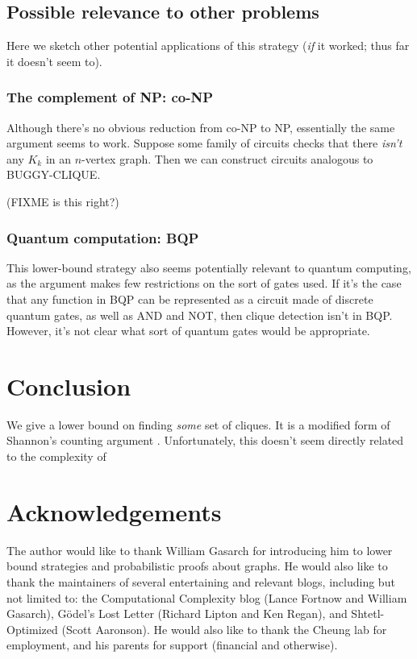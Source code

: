 \documentclass[12pt]{article}
\theoremstyle{definition}
\begin{document}
\subsection{Possible relevance to other problems}

Here we sketch other potential applications of this strategy
({\em if} it worked; thus far it doesn't seem to).

\subsubsection{The complement of NP: co-NP}

Although there's no obvious reduction from co-NP to NP, essentially
the same argument seems to work. Suppose some family of circuits
checks that there {\em isn't} any $K_k$ in an $n$-vertex graph.
Then we can construct circuits analogous to BUGGY-CLIQUE.

(FIXME is this right?)

\subsubsection{Quantum computation: BQP}

This lower-bound strategy also seems potentially
relevant to quantum computing,
as the argument makes few restrictions on the sort of gates used.
If it's the case that any function in BQP can be represented
as a circuit made of discrete quantum gates, as well as AND and NOT,
then clique detection isn't in BQP.
However, it's not clear what sort of quantum gates would be
appropriate.

\section{Conclusion}

We give a lower bound on finding {\em some} set of cliques.
It is a modified form of Shannon's counting argument
\cite{shannon_synthesis_1949}. Unfortunately,
this doesn't seem directly related to the
complexity of 

\section{Acknowledgements}

The author would like to thank William Gasarch for introducing him
to lower bound strategies and probabilistic proofs about graphs.
He would also like to thank the maintainers of
several entertaining and relevant blogs, including but
not limited to: the Computational Complexity blog
(Lance Fortnow and William Gasarch), 
G\"odel's Lost Letter (Richard Lipton and Ken Regan),
and Shtetl-Optimized (Scott Aaronson). 
He would
also like to thank the Cheung lab for
employment, and his parents for support
(financial and otherwise).



\end{document}
